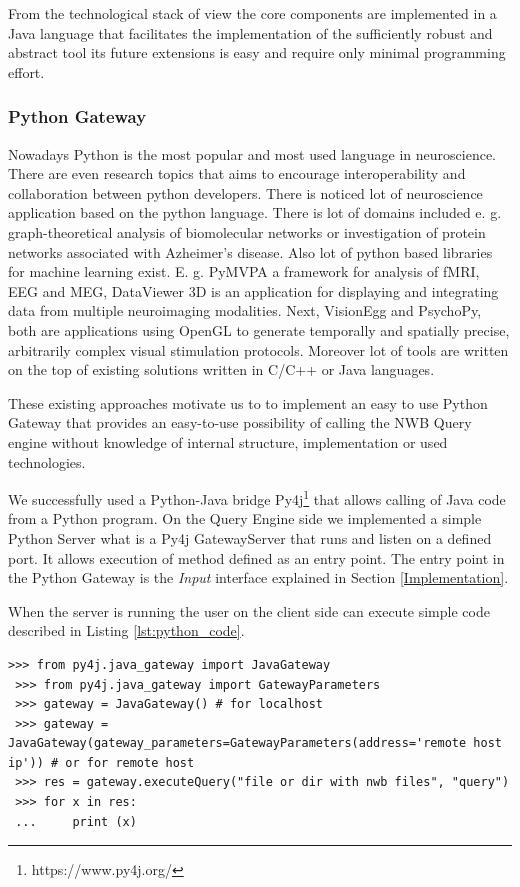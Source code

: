 \documentclass[utf8]{frontiersSCNS} %
\begin{document}
From the technological stack of view the core components are implemented in a Java language that facilitates the implementation of the sufficiently robust and abstract tool its future extensions is easy and require only minimal programming effort. 

\subsubsection{Python Gateway}
\label{Python_Gateway}

Nowadays Python is the most popular and most used language in neuroscience. There are even research topics \citep{10.3389/fninf.2015.00011} that aims to encourage interoperability and collaboration between python developers. There is noticed lot of neuroscience application based on the python language. There is lot of domains included e. g. graph-theoretical analysis of biomolecular networks or investigation of protein networks associated with Azheimer's disease. Also lot of python based libraries for machine learning exist. E. g. PyMVPA a  framework for analysis of fMRI, EEG and MEG, DataViewer 3D is an application for displaying and integrating data from multiple neuroimaging modalities. Next, VisionEgg and PsychoPy, both are applications using OpenGL to generate temporally and spatially precise, arbitrarily complex visual stimulation protocols.  Moreover lot of tools are written on the top of existing solutions written in C/C++ or Java languages. 

These existing approaches motivate us to to implement an easy to use Python Gateway that provides an easy-to-use possibility of calling the NWB Query engine without knowledge of internal structure, implementation or used technologies. 

We successfully used a Python-Java bridge Py4j\footnote{https://www.py4j.org/} that allows calling of Java code from a Python program. On the Query Engine side we implemented a simple Python Server what is a Py4j GatewayServer that runs and listen on a defined port. It allows execution of method defined as an entry point. The entry point in the Python Gateway is the \emph{Input} interface explained in Section \ref{Implementation}. 

When the server is running the user on the client side can execute simple code described in Listing \ref{lst:python_code}.

\begin{lstlisting}[caption={\emph{Example of calling the python server.} In the first step a JavaGateway is imported. From this point a JavaGateway can be accessed. When a Java Gateway is created the user can call an executeQuery method with two parameters (1) input file/dir and (2) required query. Next lines are common calling of python code as usual.},label={lst:python_code}]
 >>> from py4j.java_gateway import JavaGateway
 >>> from py4j.java_gateway import GatewayParameters
 >>> gateway = JavaGateway() # for localhost
 >>> gateway = JavaGateway(gateway_parameters=GatewayParameters(address='remote host ip')) # or for remote host
 >>> res = gateway.executeQuery("file or dir with nwb files", "query")
 >>> for x in res:
 ...     print (x)
\end{lstlisting}
\end{document}
